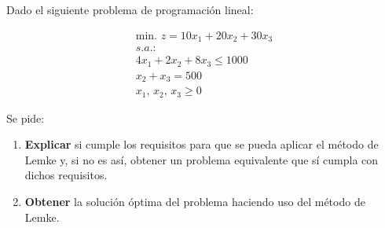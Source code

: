 Dado el siguiente problema de programación lineal:

\begin{equation}
\begin{split}
\mbox{min. } z = 10x_1 + 20x_2 + 30x_3\\
s.a.:\\
4x_1 + 2x_2 + 8x_3 \leq 1000\\
x_2 + x_3 = 500\\
x_1,\,x_2,\,x_3\geq 0
\end{split}
\end{equation}

Se pide:

\begin{enumerate}
    \item \textbf{Explicar} si cumple los requisitos para que se pueda aplicar el método de Lemke y, si no es así, obtener un problema equivalente que sí cumpla con dichos requisitos.
    \item \textbf{Obtener} la solución óptima del problema haciendo uso del método de Lemke.
\end{enumerate}
